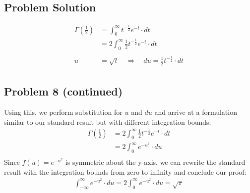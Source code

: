 \documentclass[12pt]{article}
\theoremstyle{definition}
\begin{document}
\subsection*{Problem Solution}
\begin{align*}
\Gamma \left ( \frac{1}{2} \right ) &= \int_0^\infty t^{-\frac{1}{2}}e^{-t} \cdot dt\\
&= 2 \int_0^\infty \frac{1}{2}t^{-\frac{1}{2}}e^{-t} \cdot dt\\\\
u &= \sqrt{t} \quad\Rightarrow\quad du = \frac{1}{2}t^{-\frac{1}{2}} \cdot dt\\
\end{align*}

\newpage
\subsection*{Problem 8 (continued)}
Using this, we perform substitution for $u$ and $du$ and arrive at a formulation similar to our standard result but with different integration bounds:
\begin{align*}
\Gamma \left ( \frac{1}{2} \right ) &= 2 \int_0^\infty \frac{1}{2}t^{-\frac{1}{2}}e^{-t} \cdot dt\\
&= 2\int_0^\infty e^{-u^2}\cdot du\\
\end{align*}
Since $f(u) = e^{-u^2}$ is symmetric about the y-axis, we can rewrite the standard result with the integration bounds from zero to infinity and conclude our proof:
\begin{align*}
\int_{-\infty}^\infty e^{-u^2} \cdot du = 2\int_0^\infty e^{-u^2} \cdot du= \sqrt{\pi}
\end{align*}
\end{document}
